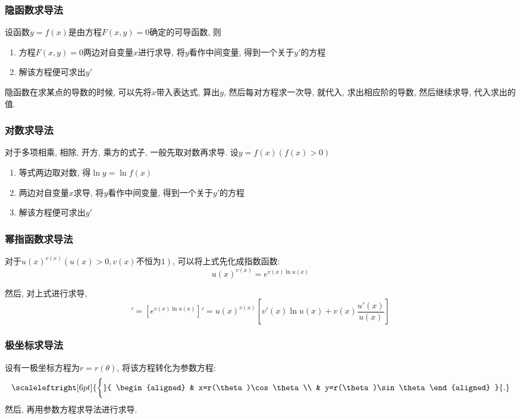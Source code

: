 \subsubsection{隐函数求导法}
设函数$ y=f(x) $是由方程$ F(x,y)=0 $确定的可导函数, 则
\begin{enumerate}
    \item 方程$ F(x,y)=0 $两边对自变量$ x $进行求导, 将$ y $看作中间变量, 得到一个关于$ y' $的方程
    \item 解该方程便可求出$ y' $
\end{enumerate}
\begin{tcolorbox}
    隐函数在求某点的导数的时候, 可以先将$ x $带入表达式, 算出$ y $, 然后每对方程求一次导, 就代入, 求出相应阶的导数, 然后继续求导, 代入求出的值.
\end{tcolorbox}
\subsubsection{对数求导法}
对于多项相乘, 相除, 开方, 乘方的式子, 一般先取对数再求导. 设$ y=f(x)(f(x)>0) $
\begin{enumerate}
    \item 等式两边取对数, 得$ \ln y=\ln f(x) $
    \item 两边对自变量$ x $求导, 将$ y $看作中间变量, 得到一个关于$ y' $的方程
    \item 解该方程便可求出$ y' $
\end{enumerate}
\subsubsection{幂指函数求导法}
对于$ u(x)^{v(x)}(u(x)>0,v(x)\text{不恒为}1) $, 可以将上式先化成指数函数:
\begin{equation*}
    u(x)^{v(x)}=e^{v(x)\ln u(x)}
\end{equation*}\par
然后, 对上式进行求导,
\begin{equation*}
    [u(x)^{v(x)}]'=[e^{v(x)\ln u(x)}]'=u(x)^{v(x)}[v'(x)\ln u(x)+v(x)\frac{u'(x)}{u(x)}]
\end{equation*}
\subsubsection{极坐标求导法}
设有一极坐标方程为$ r=r(\theta) $, 将该方程转化为参数方程:
\begin{equation*}
    \scaleleftright[6pt]{\biggl\{}{
        \begin{aligned}
             & x=r(\theta)\cos \theta \\
             & y=r(\theta)\sin \theta
        \end{aligned} }{.}
\end{equation*}
然后, 再用参数方程求导法进行求导.
